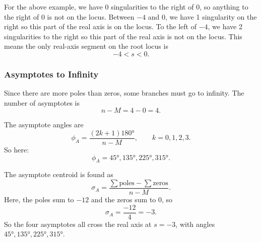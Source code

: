 For the above example, we have 0 singularities to the right of 0, so anything to the right of 0 is not on the locus.
Between $-4$ and 0, we have 1 singularity on the right so this part of the real axis is on the locus.
To the left of $-4$, we have 2 singularities to the right so this part of the real axis is not on the locus.
This means the only real-axis segment on the root locus is
\begin{equation*}
  -4 < s < 0
.\end{equation*}


\subsubsection{Asymptotes to Infinity}
Since there are more poles than zeros, some branches must go to infinity.
The number of asymptotes is
\begin{equation*}
  n - M = 4 - 0 = 4
.\end{equation*}

The asymptote angles are
\begin{equation*}
  \phi_A = \frac{(2k + 1) \ang{180} }{n - M}, \qquad k = 0,1,2,3
.\end{equation*}
So here:
\begin{equation*}
  \phi_A = \ang{45} , \ang{135} , \ang{225} , \ang{315} 
.\end{equation*}

The asymptote centroid is found as
\begin{equation*}
  \sigma_A = \frac{\sum \text{poles} - \sum \text{zeros}}{n - M}
.\end{equation*}
Here, the poles sum to $-12$ and the zeros sum to 0, so
\begin{equation*}
  \sigma_A = \frac{-12}{4} = -3
.\end{equation*}
So the four asymptotes all cross the real axis at $s = -3$, with angles $\ang{45} , \ang{135} , \ang{225} , \ang{315}$.

